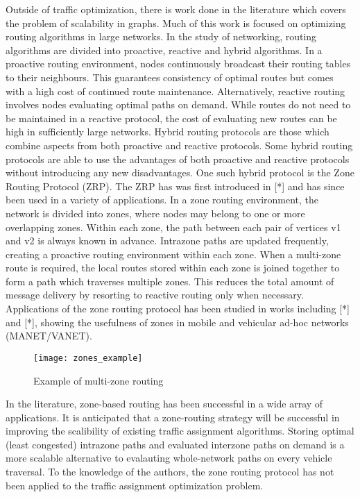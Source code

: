 \documentclass[conference]{IEEEtran}
\begin{document}
Outside of traffic optimization, there is work done in the literature which covers the problem of scalability in graphs. Much of this work is focused on optimizing routing algorithms in large networks. In the study of networking, routing algorithms are divided into proactive, reactive and hybrid algorithms. In a proactive routing environment, nodes continuously broadcast their routing tables to their neighbours. This guarantees consistency of optimal routes but comes with a high cost of continued route maintenance. Alternatively, reactive routing involves nodes evaluating optimal paths on demand. While routes do not need to be maintained in a reactive protocol, the cost of evaluating new routes can be high in sufficiently large networks. Hybrid routing protocols are those which combine aspects from both proactive and reactive protocols. Some hybrid routing protocols are able to use the advantages of both proactive and reactive protocols without introducing any new disadvantages. One such hybrid protocol is the Zone Routing Protocol (ZRP). The ZRP has was first introduced in [*] and has since been used in a variety of applications. In a zone routing environment, the network is divided into zones, where nodes may belong to one or more overlapping zones. Within each zone, the path between each pair of vertices v1 and v2 is always known in advance. Intrazone paths are updated frequently, creating a proactive routing environment within each zone. When a multi-zone route is required, the local routes stored within each zone is joined together to form a path which traverses multiple zones. This reduces the total amount of message delivery by resorting to reactive routing only when necessary. Applications of the zone routing protocol has been studied in works including [*] and [*], showing the usefulness of zones in mobile and vehicular ad-hoc networks (MANET/VANET). 

\begin{figure}[h]
\caption{Example of multi-zone routing}
\centering
\texttt{[image: zones\_example]}
\end{figure}

In the literature, zone-based routing has been successful in a wide array of applications. It is anticipated that a zone-routing strategy will be successful in improving the scalibility of existing traffic assignment algorithms. Storing optimal (least congested) intrazone paths and evaluated interzone paths on demand is a more scalable alternative to evalauting whole-network paths on every vehicle traversal. To the knowledge of the authors, the zone routing protocol has not been applied to the traffic assignment optimization problem.
\end{document}
